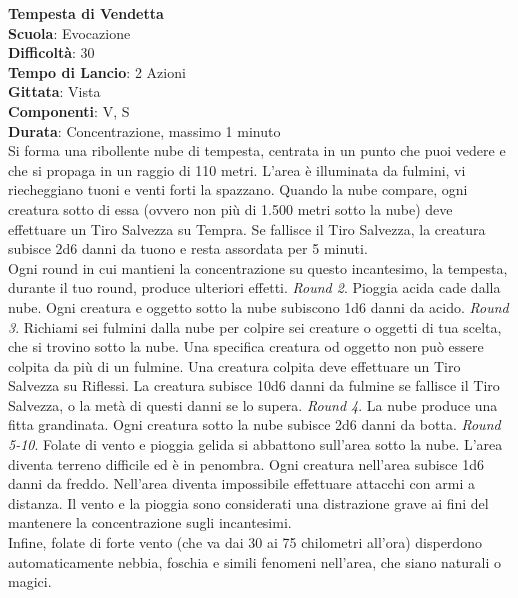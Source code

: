 \begin{multicols}{2}
\medskip\textbf{Tempesta di Vendetta}\\
\textbf{Scuola}: Evocazione\\
\textbf{Difficoltà}:  30\\
\textbf{Tempo di Lancio}: 2 Azioni\\
\textbf{Gittata}: Vista\\
\textbf{Componenti}: V, S\\
\textbf{Durata}: Concentrazione, massimo 1 minuto\\
Si forma una ribollente nube di tempesta, centrata in un punto che puoi vedere e che si propaga in un raggio di 110 metri. L’area è illuminata da fulmini, vi riecheggiano tuoni e venti forti la spazzano. Quando la nube compare, ogni creatura sotto di essa (ovvero non più di 1.500 metri sotto la nube) deve effettuare un Tiro Salvezza su Tempra. Se fallisce il Tiro Salvezza, la creatura subisce 2d6 danni da tuono e resta assordata per 5 minuti.\\
Ogni round in cui mantieni la concentrazione su questo incantesimo, la tempesta, durante il tuo round, produce ulteriori effetti.
\textit{Round 2}. Pioggia acida cade dalla nube. Ogni creatura e oggetto sotto la nube subiscono 1d6 danni da acido.
\textit{Round 3}. Richiami sei fulmini dalla nube per colpire sei creature o oggetti di tua scelta, che si trovino sotto la nube. Una specifica creatura od oggetto non può essere colpita da più di un fulmine. Una creatura colpita deve effettuare un Tiro Salvezza su Riflessi. La creatura subisce 10d6 danni da fulmine se fallisce il Tiro Salvezza, o la metà di questi danni se lo supera. 
\textit{Round 4}. La nube produce una fitta grandinata. Ogni creatura sotto la nube subisce 2d6 danni da botta.
\textit{Round 5-10}. Folate di vento e pioggia gelida si abbattono sull'area sotto la nube. L’area diventa terreno difficile ed è in penombra. Ogni creatura nell'area subisce 1d6 danni da freddo. Nell'area diventa impossibile effettuare attacchi con armi a distanza. Il vento e la pioggia sono considerati una distrazione grave ai fini del mantenere la concentrazione sugli incantesimi.\\ Infine, folate di forte vento (che va dai 30 ai 75 chilometri all'ora) disperdono automaticamente nebbia, foschia e simili fenomeni nell'area, che siano naturali o magici.


\end{multicols}
